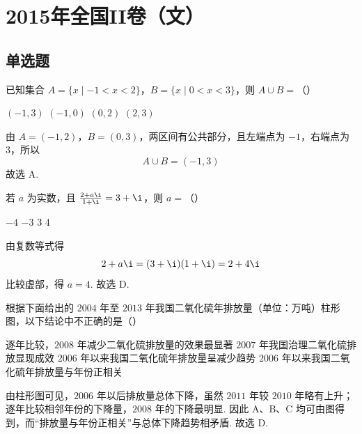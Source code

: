 
\chapter{2015年全国II卷（文）}

\section{单选题}

\begin{problem}
已知集合 \(A = \{x \mid -1 < x < 2\}\)，\(B = \{x \mid 0 < x < 3\}\)，则 \(A \cup B =\)（\quad）

\choices
    {\((-1,3)\)}
    {\((-1,0)\)}
    {\((0, 2)\)}
    {\((2,3)\)}
\end{problem}


\begin{solution}
由 \(A=(-1,2)\)，\(B=(0,3)\)，两区间有公共部分，且左端点为 \(-1\)，右端点为 \(3\)，所以
\[
A\cup B=(-1,3)
\]
故选 A.
\end{solution}

\begin{problem}
若 \(a\) 为实数，且 \(\frac{2 + a\i}{1 + \i} = 3 + \i\)，则 \(a =\)（\quad）

\choices
    {\(-4\)}
    {\(-3\)}
    {3}
    {4}
\end{problem}


\begin{solution}
由复数等式得
\[
2+a\i=(3+\i)(1+\i)=2+4\i
\]
比较虚部，得 \(a=4\). 故选 D.
\end{solution}

\begin{problem}
根据下面给出的 \(2004\) 年至 \(2013\) 年我国二氧化硫年排放量（单位：万吨）柱形图，以下结论中不正确的是（\quad）


\choices
    {逐年比较，\(2008\) 年减少二氧化硫排放量的效果最显著}
    {\(2007\) 年我国治理二氧化硫排放显现成效}
    {\(2006\) 年以来我国二氧化硫年排放量呈减少趋势}
    {\(2006\) 年以来我国二氧化硫年排放量与年份正相关}
\end{problem}


\begin{solution}
由柱形图可见，\(2006\) 年以后排放量总体下降，虽然 \(2011\) 年较 \(2010\) 年略有上升；逐年比较相邻年份的下降量，\(2008\) 年的下降最明显. 因此 A、B、C 均可由图得到，而“排放量与年份正相关”与总体下降趋势相矛盾. 故选 D.
\end{solution}

